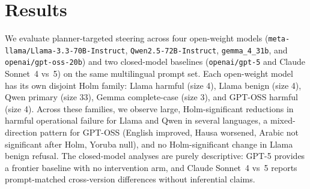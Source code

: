 
\section{Results}

We evaluate planner-targeted steering across four open-weight models
(\texttt{meta-llama/Llama-3.3-70B-Instruct}, \texttt{Qwen2.5-72B-Instruct},
\texttt{gemma\_4\_31b}, and \texttt{openai/gpt-oss-20b}) and two closed-model
baselines (\texttt{openai/gpt-5} and Claude Sonnet~4 vs~5) on the same
multilingual prompt set. Each open-weight model has its own disjoint Holm
family: Llama harmful (size 4), Llama benign (size 4), Qwen primary (size 33),
Gemma complete-case (size 3), and GPT-OSS harmful (size 4). Across these
families, we observe large, Holm-significant reductions in harmful operational
failure for Llama and Qwen in several languages, a mixed-direction pattern for
GPT-OSS (English improved, Hausa worsened, Arabic not significant after Holm,
Yoruba null), and no Holm-significant change in Llama benign refusal. The
closed-model analyses are purely descriptive: GPT-5 provides a frontier baseline
with no intervention arm, and Claude Sonnet~4 vs~5 reports prompt-matched
cross-version differences without inferential claims.














